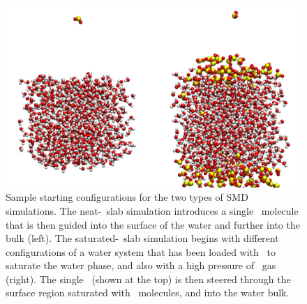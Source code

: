 \begin{figure}[h!]
	\begin{center}
		\includegraphics[scale=1.0]{images/startingconfigurations.png}
		\caption{Sample starting configurations for the two types of SMD simulations. The neat-\wat~slab simulation introduces a single \suldiox~molecule that is then guided into the surface of the water and further into the bulk (left). The saturated-\wat~slab simulation begins with different configurations of a water system that has been loaded with \suldiox~to saturate the water phase, and also with a high pressure of \suldiox~gas (right). The single \suldiox~(shown at the top) is then steered through the surface region saturated with \suldiox~molecules, and into the water bulk.}
		\label{fig:starting-configurations}
	\end{center}
\end{figure}
